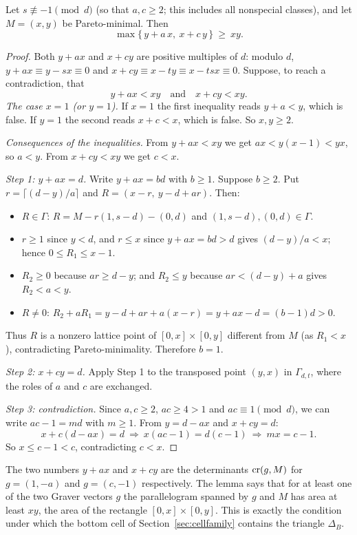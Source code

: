 \begin{lemma}\label{lem:arith}
Let $s\not\equiv-1\pmod d$ (so that $a,c\ge2$; this includes all nonspecial classes), and let $M=(x,y)$ be Pareto-minimal. Then
\[
  \boxed{\ \max\{\,y+a\,x,\ x+c\,y\,\}\ \ge\ xy.\ }
\]
\end{lemma}
\begin{proof}
Both $y+ax$ and $x+cy$ are positive multiples of $d$: modulo $d$, $y+ax\equiv y-sx\equiv0$ and $x+cy\equiv x-ty\equiv x-tsx\equiv0$. Suppose, to reach a contradiction, that
\[
  y+ax<xy\quad\text{and}\quad x+cy<xy.
\]
\emph{The case $x=1$ (or $y=1$).} If $x=1$ the first inequality reads $y+a<y$, which is false. If $y=1$ the second reads $x+c<x$, which is false. So $x,y\ge2$.

\emph{Consequences of the inequalities.} From $y+ax<xy$ we get $ax<y(x-1)<yx$, so $a<y$. From $x+cy<xy$ we get $c<x$.

\emph{Step 1: $y+ax=d$.} Write $y+ax=bd$ with $b\ge1$. Suppose $b\ge2$. Put $r=\lceil(d-y)/a\rceil$ and $R=(x-r,\ y-d+ar)$. Then:
\begin{itemize}
\item $R\in\Gamma$: $R=M-r(1,s-d)-(0,d)$ and $(1,s-d),(0,d)\in\Gamma$.
\item $r\ge1$ since $y<d$, and $r\le x$ since $y+ax=bd>d$ gives $(d-y)/a<x$; hence $0\le R_1\le x-1$.
\item $R_2\ge0$ because $ar\ge d-y$; and $R_2\le y$ because $ar<(d-y)+a$ gives $R_2<a<y$.
\item $R\ne0$: $R_2+aR_1=y-d+ar+a(x-r)=y+ax-d=(b-1)d>0$.
\end{itemize}
Thus $R$ is a nonzero lattice point of $[0,x]\times[0,y]$ different from $M$ (as $R_1<x$), contradicting Pareto-minimality. Therefore $b=1$.

\emph{Step 2: $x+cy=d$.} Apply Step 1 to the transposed point $(y,x)$ in $\Gamma_{d,t}$, where the roles of $a$ and $c$ are exchanged.

\emph{Step 3: contradiction.} Since $a,c\ge2$, $ac\ge4>1$ and $ac\equiv1\pmod d$, we can write $ac-1=md$ with $m\ge1$. From $y=d-ax$ and $x+cy=d$:
\[
  x+c(d-ax)=d\ \Longrightarrow\ x(ac-1)=d(c-1)\ \Longrightarrow\ mx=c-1.
\]
So $x\le c-1<c$, contradicting $c<x$.
\end{proof}

\begin{remark}
The two numbers $y+ax$ and $x+cy$ are the determinants $\operatorname{cr}(g,M)$ for $g=(1,-a)$ and $g=(c,-1)$ respectively. The lemma says that for at least one of the two Graver vectors $g$ the parallelogram spanned by $g$ and $M$ has area at least $xy$, the area of the rectangle $[0,x]\times[0,y]$. This is exactly the condition under which the bottom cell of Section~\ref{sec:cellfamily} contains the triangle $\Delta_B$.
\end{remark}

